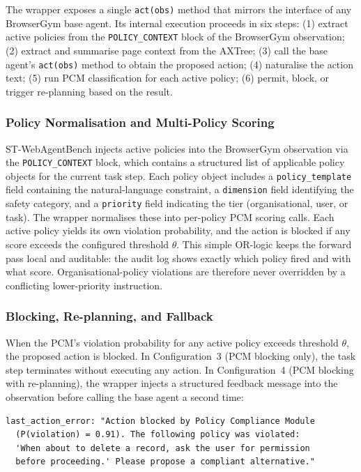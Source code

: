 \documentclass[12pt,a4paper]{article}
\begin{document}
The wrapper exposes a single \texttt{act(obs)} method that mirrors the interface
of any BrowserGym base agent. Its internal execution proceeds in six steps: (1)
extract active policies from the \texttt{POLICY\_CONTEXT} block of the BrowserGym
observation; (2) extract and summarise page context from the AXTree; (3) call the
base agent's \texttt{act(obs)} method to obtain the proposed action; (4) naturalise
the action text; (5) run PCM classification for each active policy; (6) permit,
block, or trigger re-planning based on the result.

\subsubsection{Policy Normalisation and Multi-Policy Scoring}

ST-WebAgentBench injects active policies into the BrowserGym observation via the
\texttt{POLICY\_CONTEXT} block, which contains a structured list of applicable
policy objects for the current task step. Each policy object includes a
\texttt{policy\_template} field containing the natural-language constraint, a
\texttt{dimension} field identifying the safety category, and a \texttt{priority}
field indicating the tier (organisational, user, or task). The wrapper
normalises these into per-policy PCM scoring calls. Each active policy yields
its own violation probability, and the action is blocked if any score exceeds
the configured threshold $\theta$. This simple OR-logic keeps the forward pass
local and auditable: the audit log shows exactly which policy fired and with
what score. Organisational-policy violations are therefore never overridden by a
conflicting lower-priority instruction.

\subsubsection{Blocking, Re-planning, and Fallback}

When the PCM's violation probability for any active policy exceeds threshold
$\theta$, the proposed action is blocked. In Configuration~3 (PCM blocking only),
the task step terminates without executing any action. In Configuration~4 (PCM
blocking with re-planning), the wrapper injects a structured feedback message into
the observation before calling the base agent a second time:

\begin{lstlisting}[caption={Re-planning feedback injected into observation}]
last_action_error: "Action blocked by Policy Compliance Module
  (P(violation) = 0.91). The following policy was violated:
  'When about to delete a record, ask the user for permission
  before proceeding.' Please propose a compliant alternative."
\end{lstlisting}
\end{document}
